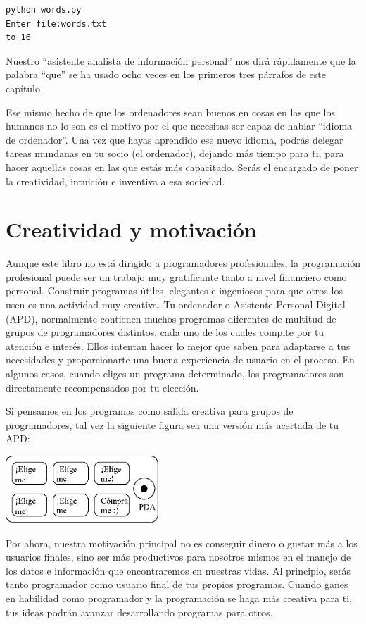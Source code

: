 \beforeverb
\begin{verbatim}
python words.py
Enter file:words.txt
to 16
\end{verbatim}
\afterverb
%
Nuestro ``asistente analista de información personal'' nos dirá
rápidamente que la palabra ``que'' se ha usado ocho veces en los
primeros tres párrafos de este capítulo.

Ese mismo hecho de que los ordenadores sean buenos en cosas
en las que los humanos no lo son es el motivo por el que necesitas
ser capaz de hablar ``idioma de ordenador''. Una vez que hayas
aprendido ese nuevo idioma, podrás delegar tareas mundanas
en tu socio (el ordenador), dejando más tiempo
para ti, para hacer aquellas cosas
en las que estás más capacitado. Serás el encargado
de poner la creatividad, intuición e inventiva a esa
sociedad.

\section{Creatividad y motivación}

Aunque este libro no está dirigido a programadores profesionales, la programación
profesional puede ser un trabajo muy gratificante tanto a nivel financiero como personal.
Construir programas útiles, elegantes e ingeniosos para que otros los usen
es una actividad muy creativa. Tu ordenador o Asistente Personal Digital (APD),
normalmente contienen muchos programas diferentes de multitud de grupos de programadores
distintos, cada uno de los cuales compite por tu atención e interés.
Ellos intentan hacer lo mejor que saben para adaptarse a tus necesidades y proporcionarte
una buena experiencia de usuario en el proceso. En algunos casos, cuando eliges un programa
determinado, los programadores son directamente recompensados por tu elección.

Si pensamos en los programas como salida creativa para grupos de programadores,
tal vez la siguiente figura sea una versión más acertada de tu APD:

\beforefig
\centerline{\includegraphics[height=1.00in]{figs2/pda2.eps}}
\afterfig

Por ahora, nuestra motivación principal no es conseguir dinero o gustar más a los usuarios
finales, sino ser más productivos para nosotros mismos en el manejo de los datos e
información que encontraremos en nuestras vidas.
Al principio, serás tanto programador como usuario final de tus propios programas.
Cuando ganes en habilidad como programador y la programación se haga más creativa para ti,
tus ideas podrán avanzar desarrollando programas para otros.

